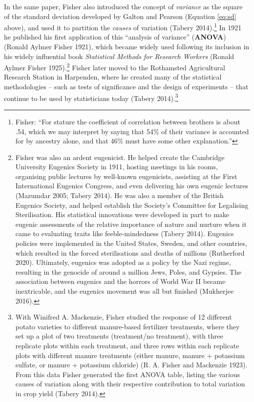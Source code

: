 \documentclass[
]{book}
\begin{document}
In the same paper, Fisher also introduced the concept of \emph{variance} as the square of the standard deviation developed by Galton and Pearson (Equation \eqref{eq:sd} above), and used it to partition the \emph{causes} of variation (Tabery 2014).\footnote{Fisher: ``For stature the coefficient of correlation between brothers is about .54, which we may interpret by saying that 54\% of their variance is accounted for by ancestry alone, and that 46\% must have some other explanation.''} In 1921 he published his first application of this ``analysis of variance'' (\textbf{ANOVA}) (Ronald Aylmer Fisher 1921), which became widely used following its inclusion in his widely influential book \emph{Statistical Methods for Research Workers} (Ronald Aylmer Fisher 1925).\footnote{Fisher was also an ardent eugenicist. He helped create the Cambridge University Eugenics Society in 1911, hosting meetings in his rooms, organising public lectures by well-known eugenicists, assisting at the First International Eugenics Congress, and even delivering his own eugenic lectures (Mazumdar 2005; Tabery 2014). He was also a member of the British Eugenics Society, and helped establish the Society's Committee for Legalising Sterilisation. His statistical innovations were developed in part to make eugenic assessments of the relative importance of nature and nurture when it came to evaluating traits like feeble-mindedness (Tabery 2014). Eugenics policies were implemented in the United States, Sweden, and other countries, which resulted in the forced sterilisations and deaths of millions (Rutherford 2020). Ultimately, eugenics was adopted as a policy by the Nazi regime, resulting in the genocide of around a million Jews, Poles, and Gypsies. The association between eugenics and the horrors of World War II became inextricable, and the eugenics movement was all but finished (Mukherjee 2016).} Fisher later moved to the Rothamsted Agricultural Research Station in Harpenden, where he created many of the statistical methodologies -- such as tests of significance and the design of experiments -- that continue to be used by statisticians today (Tabery 2014).\footnote{With Winifred A. Mackenzie, Fisher studied the response of 12 different potato varieties to different manure-based fertilizer treatments, where they set up a plot of two treatments (treatment/no treatment), with three replicate plots within each treatment, and three rows within each replicate plots with different manure treatments (either manure, manure + potassium sulfate, or manure + potassium chloride) (R. A. Fisher and Mackenzie 1923). From this data Fisher generated the first ANOVA table, listing the various causes of variation along with their respective contribution to total variation in crop yield (Tabery 2014).}
\end{document}
